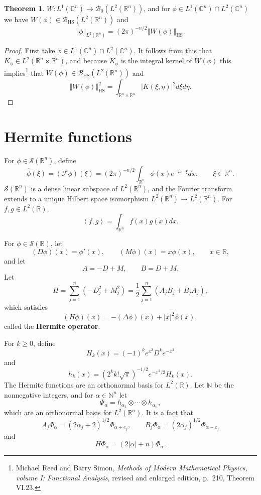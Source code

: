 \documentclass{article}
\newcommand{\inner}[2]{\left\langle #1, #2 \right\rangle}
\newcommand{\norm}[1]{\left\Vert #1 \right\Vert}
\newcommand{\HS}[1]{\left\Vert #1 \right\Vert_{\mathrm{HS}}}
\theoremstyle{definition}
\newtheorem{theorem}{Theorem}
\theoremstyle{definition}
\begin{document}
\begin{theorem}
$W:L^1(\mathbb{C}^n) \to \mathscr{B}_0(L^2(\mathbb{R}^n))$, and for $\phi \in L^1(\mathbb{C}^n) \cap L^2(\mathbb{C}^n)$ we have
$W(\phi) \in \mathscr{B}_{\mathrm{HS}}(L^2(\mathbb{R}^n))$ and
\[
\norm{\phi}_{L^2(\mathbb{R}^n)} = (2\pi)^{-n/2} \norm{W(\phi)}_{\mathrm{HS}}.
\]
\end{theorem}
\begin{proof}
First take $\phi \in L^1(\mathbb{C}^n) \cap L^2(\mathbb{C}^n)$. It follows from this that $K_\phi \in L^2(\mathbb{R}^n \times
\mathbb{R}^n)$, and because $K_\phi$ is the integral kernel of $W(\phi)$ this implies\footnote{Michael Reed and Barry Simon, {\em Methods
of Modern Mathematical Physics, volume I: Functional Analysis}, revised and enlarged edition,
p.~210, Theorem VI.23.} that $W(\phi) \in \mathscr{B}_{\mathrm{HS}}(L^2(\mathbb{R}^n))$ and
\[
\HS{W(\phi)}^2 = \int_{\mathbb{R}^n \times \mathbb{R}^n} |K(\xi,\eta)|^2 d\xi d\eta.
\]
\end{proof}






\section{Hermite functions}
For $\phi \in \mathscr{S}(\mathbb{R}^n)$, define
\[
\widehat{\phi}(\xi) =(\mathscr{F} \phi)(\xi) =   (2\pi)^{-n/2} \int_{\mathbb{R}^n} \phi(x) e^{-ix\cdot \xi} dx,\qquad \xi \in \mathbb{R}^n.
\]
$\mathscr{S}(\mathbb{R}^n)$ is a dense linear subspace of $L^2(\mathbb{R}^n)$, and the Fourier transform
 extends  to a unique Hilbert space isomorphism $L^2(\mathbb{R}^n) \to L^2(\mathbb{R}^n)$.
 For $f,g \in L^2(\mathbb{R})$,
 \[
 \inner{f}{g} = \int_{\mathbb{R}^n} f(x) \overline{g(x)} dx.
 \]

For $\phi \in \mathscr{S}(\mathbb{R})$, let
\[
(D\phi)(x) = \phi'(x),\qquad (M\phi)(x)=x\phi(x),\qquad x \in \mathbb{R},
\]
and let
\[
A = -D+M,\qquad B=D+M.
\]
Let
\[
H  = \sum_{j=1}^n (-D_j^2+M_j^2) = \frac{1}{2} \sum_{j=1}^n (A_j B_j + B_j A_j),
\]
which satisfies
\[
(H \phi)(x) = -(\Delta \phi)(x) +|x|^2 \phi(x),
\]
called the \textbf{Hermite operator}.


For $k \geq 0$, define
\[
H_k(x)=(-1)^k e^{x^2} D^k e^{-x^2}
\]
and
\[
h_k(x) = (2^k k! \sqrt{\pi})^{-1/2} e^{-x^2/2}  H_k(x).
\]
The Hermite functions are an orthonormal basis for $L^2(\mathbb{R})$.
Let $\mathbb{N}$ be the nonnegative integers, and for $\alpha \in \mathbb{N}^n$ let
\[
\Phi_\alpha = h_{\alpha_1} \otimes \cdots \otimes h_{\alpha_n},
\]
which are an orthonormal basis for $L^2(\mathbb{R}^n)$. 
It is a fact that
\[
A_j \Phi_\alpha = (2\alpha_j + 2)^{1/2} \Phi_{\alpha+e_j},\qquad B_j \Phi_\alpha
=(2\alpha_j)^{1/2} \Phi_{\alpha-e_j}
\]
and
\[
H\Phi_\alpha = (2|\alpha|+n)\Phi_\alpha.
\]
\end{document}
